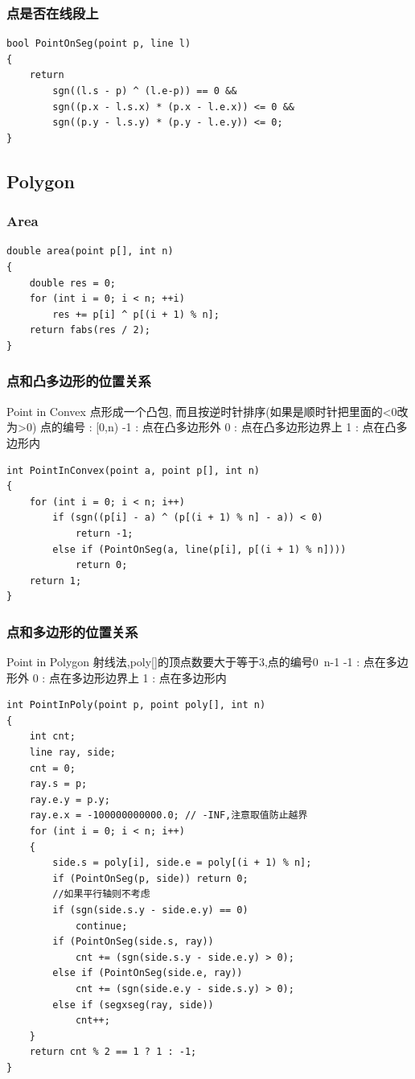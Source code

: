 \documentclass[twoside]{article}
\begin{document}
\subsubsection{点是否在线段上}
\begin{lstlisting}
bool PointOnSeg(point p, line l)
{
    return
        sgn((l.s - p) ^ (l.e-p)) == 0 &&
        sgn((p.x - l.s.x) * (p.x - l.e.x)) <= 0 &&
        sgn((p.y - l.s.y) * (p.y - l.e.y)) <= 0;
}
\end{lstlisting}
\subsection{Polygon}
\subsubsection{Area}
\begin{lstlisting}
double area(point p[], int n)
{
    double res = 0;
    for (int i = 0; i < n; ++i)
        res += p[i] ^ p[(i + 1) % n];
    return fabs(res / 2);
}
\end{lstlisting}
\subsubsection{点和凸多边形的位置关系}
Point in Convex
点形成一个凸包, 而且按逆时针排序(如果是顺时针把里面的<0改为>0)
点的编号 : [0,n)
-1 : 点在凸多边形外
0  : 点在凸多边形边界上
1  : 点在凸多边形内
\begin{lstlisting}
int PointInConvex(point a, point p[], int n)
{
    for (int i = 0; i < n; i++)
        if (sgn((p[i] - a) ^ (p[(i + 1) % n] - a)) < 0)
            return -1;
        else if (PointOnSeg(a, line(p[i], p[(i + 1) % n])))
            return 0;
    return 1;
}
\end{lstlisting}
\subsubsection{点和多边形的位置关系}
Point in Polygon
射线法,poly[]的顶点数要大于等于3,点的编号0~n-1
-1 : 点在多边形外
0  : 点在多边形边界上
1  : 点在多边形内
\begin{lstlisting}
int PointInPoly(point p, point poly[], int n)
{
    int cnt;
    line ray, side;
    cnt = 0;
    ray.s = p;
    ray.e.y = p.y;
    ray.e.x = -100000000000.0; // -INF,注意取值防止越界
    for (int i = 0; i < n; i++)
    {
        side.s = poly[i], side.e = poly[(i + 1) % n];
        if (PointOnSeg(p, side)) return 0;
        //如果平行轴则不考虑
        if (sgn(side.s.y - side.e.y) == 0)
            continue;
        if (PointOnSeg(side.s, ray))
            cnt += (sgn(side.s.y - side.e.y) > 0);
        else if (PointOnSeg(side.e, ray))
            cnt += (sgn(side.e.y - side.s.y) > 0);
        else if (segxseg(ray, side))
            cnt++;
    }
    return cnt % 2 == 1 ? 1 : -1;
}
\end{lstlisting}
\end{document}
